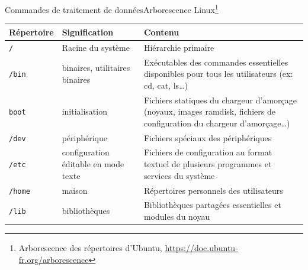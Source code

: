 \documentclass{beamer}
\begin{document}
    \begin{frame}{Commandes de traitement de données}{Arborescence Linux\footnote{\label{arborescence-linux}Arborescence des répertoires d’Ubuntu, \url{https://doc.ubuntu-fr.org/arborescence}}}
        \begin{tiny}
            \begin{table}[h!]
                \centering
                \begin{tabular}{|l|p{3cm}|p{6cm}|}
                    \hline
                    \textbf{Répertoire} & \textbf{Signification}               & \textbf{Contenu}                                                                                                               \\
                    \hline
                    \lstinline{/}       & Racine du système                    & Hiérarchie primaire                                                                                                            \\
                    \hline
                    \lstinline{/bin}    & binaires, utilitaires binaires       & Exécutables des commandes essentielles disponibles pour tous les utilisateurs (ex: cd, cat, ls…)                               \\
                    \hline
                    \lstinline{boot}    & initialisation                       & Fichiers statiques du chargeur d’amorçage (noyaux, images ramdisk, fichiers de configuration du chargeur d'amorçage…)          \\
                    \hline
                    \lstinline{/dev}    & périphérique                         & Fichiers spéciaux des périphériques                                                                                            \\
                    \hline
                    \lstinline{/etc}    & configuration éditable en mode texte & Fichiers de configuration au format textuel de plusieurs programmes et services du système                                     \\
                    \hline
                    \lstinline{/home}   & maison                               & Répertoires personnels des utilisateurs                                                                                        \\
                    \hline
                    \lstinline{/lib}    & bibliothèques                        & Bibliothèques partagées essentielles et modules du noyau                                                                       \\

\end{tabular}
\end{table}
\end{tiny}
\end{frame}
\end{document}
